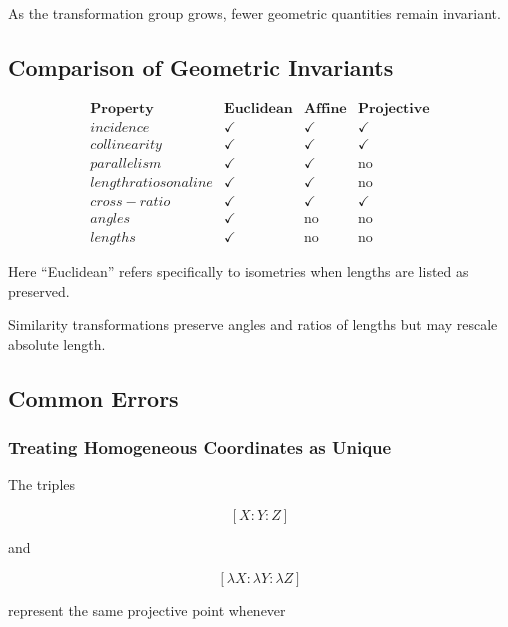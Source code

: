 As the transformation group grows, fewer geometric quantities remain
invariant.

\subsection{Comparison of Geometric Invariants}
\label{subsec:comparison-geometric-invariants}

\[
\begin{array}{c|c|c|c}
\textbf{Property}
& \textbf{Euclidean}
& \textbf{Affine}
& \textbf{Projective}\\
\hline
incidence & \checkmark & \checkmark & \checkmark\\
collinearity & \checkmark & \checkmark & \checkmark\\
parallelism & \checkmark & \checkmark & \text{no}\\
length ratios on a line & \checkmark & \checkmark & \text{no}\\
cross-ratio & \checkmark & \checkmark & \checkmark\\
angles & \checkmark & \text{no} & \text{no}\\
lengths & \checkmark & \text{no} & \text{no}
\end{array}
\]

Here ``Euclidean'' refers specifically to isometries when lengths are listed
as preserved.

Similarity transformations preserve angles and ratios of lengths but may
rescale absolute length.

\subsection{Common Errors}
\label{subsec:projective-common-errors}

\subsubsection{Treating Homogeneous Coordinates as Unique}

The triples

\[
[X:Y:Z]
\]

and

\[
[\lambda X:\lambda Y:\lambda Z]
\]

represent the same projective point whenever

